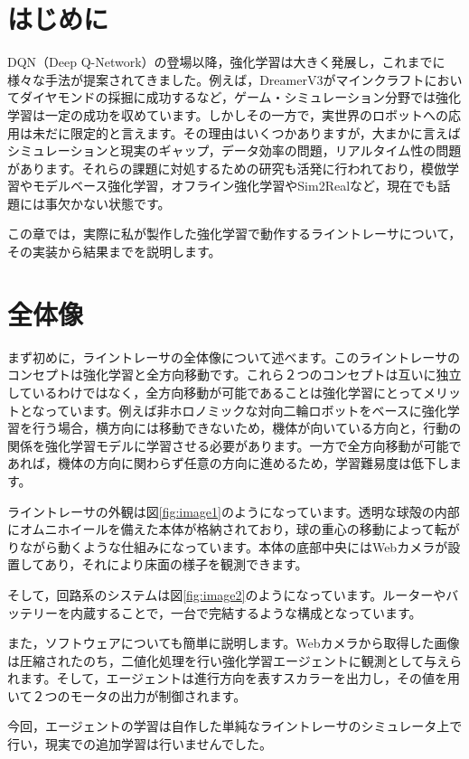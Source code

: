 \section{はじめに}
DQN（Deep Q-Network\cite{mnih2013playing}）の登場以降，強化学習は大きく発展し，これまでに様々な手法が提案されてきました。例えば，DreamerV3\cite{hafner2024masteringdiversedomainsworld}がマインクラフトにおいてダイヤモンドの採掘に成功するなど，ゲーム・シミュレーション分野では強化学習は一定の成功を収めています。しかしその一方で，実世界のロボットへの応用は未だに限定的と言えます。その理由はいくつかありますが，大まかに言えばシミュレーションと現実のギャップ，データ効率の問題，リアルタイム性の問題があります。それらの課題に対処するための研究も活発に行われており，模倣学習やモデルベース強化学習，オフライン強化学習やSim2Realなど，現在でも話題には事欠かない状態です。

この章では，実際に私が製作した強化学習で動作するライントレーサについて，その実装から結果までを説明します。

\section{全体像}
まず初めに，ライントレーサの全体像について述べます。このライントレーサのコンセプトは強化学習と全方向移動です。これら２つのコンセプトは互いに独立しているわけではなく，全方向移動が可能であることは強化学習にとってメリットとなっています。例えば非ホロノミックな対向二輪ロボットをベースに強化学習を行う場合，横方向には移動できないため，機体が向いている方向と，行動の関係を強化学習モデルに学習させる必要があります。一方で全方向移動が可能であれば，機体の方向に関わらず任意の方向に進めるため，学習難易度は低下します。

ライントレーサの外観は図\ref{fig:image1}のようになっています。透明な球殻の内部にオムニホイールを備えた本体が格納されており，球の重心の移動によって転がりながら動くような仕組みになっています。本体の底部中央にはWebカメラが設置してあり，それにより床面の様子を観測できます。

そして，回路系のシステムは図\ref{fig:image2}のようになっています。ルーターやバッテリーを内蔵することで，一台で完結するような構成となっています。

また，ソフトウェアについても簡単に説明します。Webカメラから取得した画像は圧縮されたのち，二値化処理を行い強化学習エージェントに観測として与えられます。そして，エージェントは進行方向を表すスカラーを出力し，その値を用いて２つのモータの出力が制御されます。

今回，エージェントの学習は自作した単純なライントレーサのシミュレータ上で行い，現実での追加学習は行いませんでした。

